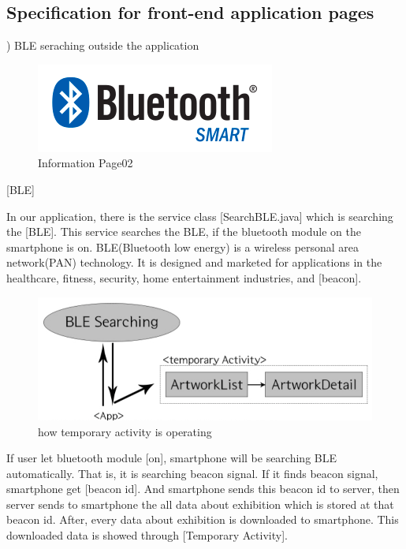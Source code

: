 \documentclass[conference]{IEEEtran}
\begin{document}
\subsection{Specification for front-end application pages\\}
) BLE seraching outside the application\\
\begin{figure}[htbp]
\begin{center}
    \includegraphics[scale=1]{img_BLE}
    \caption{Information Page02} 
\end{center}
\end{figure}

[BLE]

In our application, there is the service class [SearchBLE.java] which is searching the [BLE]. This service searches the BLE, if the bluetooth module on the smartphone is on. BLE(Bluetooth low energy) is a wireless personal area network(PAN) technology. It is designed and marketed for applications in the healthcare, fitness, security, home entertainment industries, and [beacon].\\

\begin{figure}[htbp]
\begin{center}
    \includegraphics[scale=0.35]{img_tempAct}
    \caption{how temporary activity is operating} 
\end{center}
\end{figure}


If user let bluetooth module [on], smartphone will be searching BLE automatically. That is, it is searching beacon signal. If it finds beacon signal, smartphone get [beacon id]. And smartphone sends this beacon id to server, then server sends to smartphone the all data about exhibition which is stored at that beacon id. After, every data about exhibition is downloaded to smartphone. This downloaded data is showed through [Temporary Activity]. \\
\end{document}
